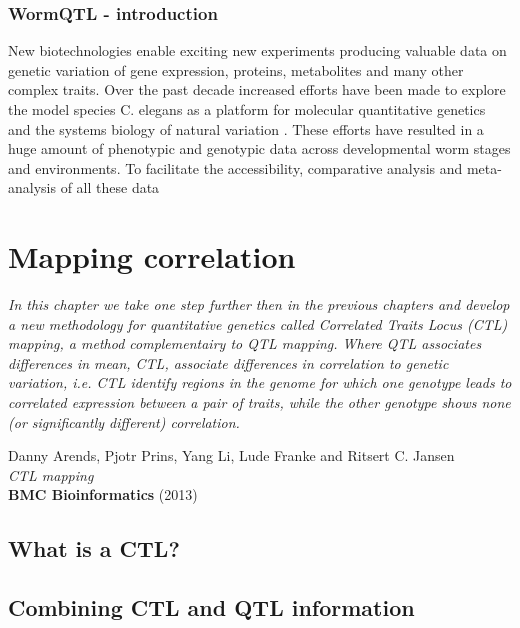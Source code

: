\documentclass[8pt, twoside, a5paper]{report}
\newenvironment{myexampleblock}[1]{%
    \tcolorbox[beamer,%
    noparskip,breakable,
    colback=LightGreen,colframe=DarkGreen,%
    colbacklower=LimeGreen!75!LightGreen,%
    title=#1]}%
    {\endtcolorbox}
\newcommand{\authors}[1]{\small{#1}}
\newcommand{\bold}[1]{{\bfseries #1}}
\begin{document}
  \subsection{WormQTL - introduction}
  New biotechnologies enable exciting new experiments producing valuable data on genetic variation of gene 
  expression, proteins, metabolites and many other complex traits. Over the past decade increased efforts 
  have been made to explore the model species C. elegans as a platform for molecular quantitative genetics 
  and the systems biology of natural variation \cite{Gaertner:2010, Kammenga:2008}. These efforts have 
  resulted in a huge amount of phenotypic and genotypic data across developmental worm stages and environments. 
  To facilitate the accessibility, comparative analysis and meta-analysis of all these data \cite{Swertz:2007} 


\chapter{Mapping correlation}

\emph{In this chapter we take one step further then in the previous chapters and develop a new methodology for
quantitative genetics called Correlated Traits Locus (CTL) mapping, a method complementairy to QTL mapping. 
Where QTL associates differences in mean, CTL, associate differences in correlation to genetic variation, i.e. 
CTL identify regions in the genome for which one genotype leads to correlated expression between a pair of 
traits, while the other genotype shows none (or significantly different) correlation.}

\null
\vfill

\begin{myexampleblock}{In press:}
  \authors{Danny Arends, Pjotr Prins, Yang Li, Lude Franke and Ritsert C. Jansen}\\
  \emph{CTL mapping}\\
  \bold{BMC Bioinformatics} (2013)
\end{myexampleblock}

\newpage

\section{What is a CTL?}
\lipsum[1]

\section{Combining CTL and QTL information}
\lipsum
\end{document}
